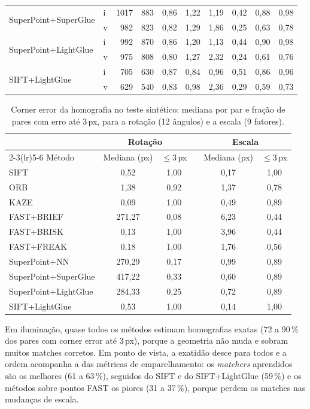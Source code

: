 \documentclass[11pt,a4paper]{article}
\newcommand{\px}{\,px}
\begin{document}
\begin{table}[H]
\begin{tabular}{llrrcccccc}
\multirow{2}{*}{SuperPoint+SuperGlue} & i & 1017 & 883 & 0,86 & 1,22 & 1,19 & 0,42 & 0,88 & 0,98 \\
 & v & 982 & 823 & 0,82 & 1,29 & 1,86 & 0,25 & 0,63 & 0,78 \\
\multirow{2}{*}{SuperPoint+LightGlue} & i & 992 & 870 & 0,86 & 1,20 & 1,13 & 0,44 & 0,90 & 0,98 \\
 & v & 975 & 808 & 0,80 & 1,27 & 2,32 & 0,24 & 0,61 & 0,76 \\
\multirow{2}{*}{SIFT+LightGlue} & i & 705 & 630 & 0,87 & 0,84 & 0,96 & 0,51 & 0,86 & 0,96 \\
 & v & 629 & 540 & 0,83 & 0,98 & 2,36 & 0,29 & 0,59 & 0,73 \\
\bottomrule
\end{tabular}
\end{table}

\begin{table}[H]
\centering\small
\caption{Corner error da homografia no teste sintético: mediana por par e fração de pares com erro até
3\px, para a rotação (12 ângulos) e a escala (9 fatores).}
\label{tab:homografia-rotesc}
\begin{tabular}{lcc@{\hspace{1.5em}}ccc}
\toprule
 & \multicolumn{2}{c}{Rotação} & & \multicolumn{2}{c}{Escala} \\
\cmidrule(lr){2-3}\cmidrule(lr){5-6}
Método & Mediana (px) & $\le 3$\px & & Mediana (px) & $\le 3$\px \\
\midrule
SIFT & 0,52 & 1,00 & & 0,17 & 1,00 \\
ORB & 1,38 & 0,92 & & 1,37 & 0,78 \\
KAZE & 0,09 & 1,00 & & 0,49 & 0,89 \\
FAST+BRIEF & 271,27 & 0,08 & & 6,23 & 0,44 \\
FAST+BRISK & 0,13 & 1,00 & & 3,96 & 0,44 \\
FAST+FREAK & 0,18 & 1,00 & & 1,76 & 0,56 \\
\midrule
SuperPoint+NN & 270,29 & 0,17 & & 0,99 & 0,89 \\
SuperPoint+SuperGlue & 417,22 & 0,33 & & 0,60 & 0,89 \\
SuperPoint+LightGlue & 284,33 & 0,25 & & 0,72 & 0,89 \\
SIFT+LightGlue & 0,53 & 1,00 & & 0,14 & 1,00 \\
\bottomrule
\end{tabular}
\end{table}

Em iluminação, quase todos os métodos estimam homografias exatas (72 a 90\,\% dos pares com corner error até 3\,px), porque a geometria não muda e sobram muitos matches corretos. Em ponto de vista, a exatidão desce para todos e a ordem acompanha a das métricas de emparelhamento: os \textit{matchers} aprendidos são os melhores (61 a 63\,\%), seguidos do SIFT e do SIFT+LightGlue (59\,\%) e os métodos sobre pontos FAST os piores (31 a 37\,\%), porque perdem os matches nas mudanças de escala.
\end{document}
